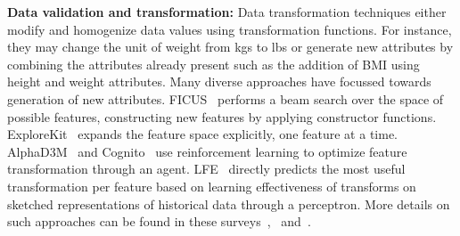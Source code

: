\documentclass[sigconf, nonacm]{acmart}
\begin{document}
\noindent \textbf{Data validation and transformation: }
Data transformation techniques either modify and homogenize data values using transformation functions. For instance, they may change the unit of weight from kgs to lbs or generate new attributes by combining the attributes already present such as the addition of BMI using height and weight attributes. Many diverse approaches have focussed towards generation of new attributes.
FICUS~\cite{MarkovitchRosenstein02} performs a beam search over the space of possible features, constructing new features by applying constructor functions. ExploreKit~\cite{DBLP:conf/icdm/KatzSS16} expands the feature space explicitly, one feature at a time. AlphaD3M~\cite{alphad3m} and Cognito~\cite{khurana2016cognito} use reinforcement learning to optimize feature transformation through an agent. LFE~\cite{lfe} directly predicts the most useful transformation per feature based on learning effectiveness of transforms on sketched representations of historical data through a perceptron. %
More details on such approaches can be found in these  surveys~\cite{fechapter},~\cite{zoller2021benchmark} and~\cite{sondhi:2009}.


\end{document}

